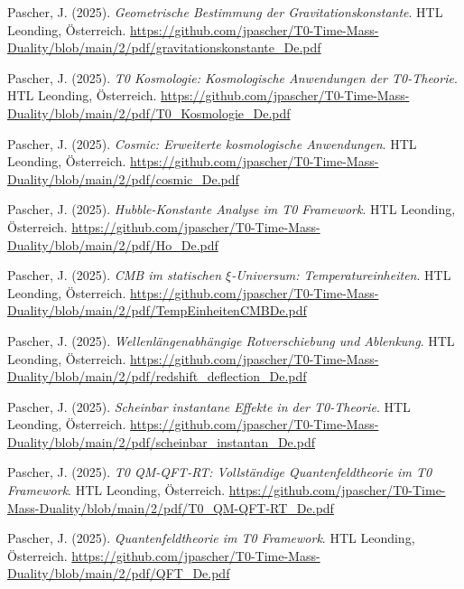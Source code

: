 \documentclass{article}
\begin{document}
\begin{thebibliography}{99}
		Pascher, J. (2025).
		\textit{Geometrische Bestimmung der Gravitationskonstante}.
		HTL Leonding, Österreich.
		\url{https://github.com/jpascher/T0-Time-Mass-Duality/blob/main/2/pdf/gravitationskonstante_De.pdf}
		
		
		Pascher, J. (2025).
		\textit{T0 Kosmologie: Kosmologische Anwendungen der T0-Theorie}.
		HTL Leonding, Österreich.
		\url{https://github.com/jpascher/T0-Time-Mass-Duality/blob/main/2/pdf/T0_Kosmologie_De.pdf}
		
		Pascher, J. (2025).
		\textit{Cosmic: Erweiterte kosmologische Anwendungen}.
		HTL Leonding, Österreich.
		\url{https://github.com/jpascher/T0-Time-Mass-Duality/blob/main/2/pdf/cosmic_De.pdf}
		
		Pascher, J. (2025).
		\textit{Hubble-Konstante Analyse im T0 Framework}.
		HTL Leonding, Österreich.
		\url{https://github.com/jpascher/T0-Time-Mass-Duality/blob/main/2/pdf/Ho_De.pdf}
		
		Pascher, J. (2025).
		\textit{CMB im statischen $\xi$-Universum: Temperatureinheiten}.
		HTL Leonding, Österreich.
		\url{https://github.com/jpascher/T0-Time-Mass-Duality/blob/main/2/pdf/TempEinheitenCMBDe.pdf}
		
		Pascher, J. (2025).
		\textit{Wellenlängenabhängige Rotverschiebung und Ablenkung}.
		HTL Leonding, Österreich.
		\url{https://github.com/jpascher/T0-Time-Mass-Duality/blob/main/2/pdf/redshift_deflection_De.pdf}
		
		Pascher, J. (2025).
		\textit{Scheinbar instantane Effekte in der T0-Theorie}.
		HTL Leonding, Österreich.
		\url{https://github.com/jpascher/T0-Time-Mass-Duality/blob/main/2/pdf/scheinbar_instantan_De.pdf}
		
		
		Pascher, J. (2025).
		\textit{T0 QM-QFT-RT: Vollständige Quantenfeldtheorie im T0 Framework}.
		HTL Leonding, Österreich.
		\url{https://github.com/jpascher/T0-Time-Mass-Duality/blob/main/2/pdf/T0_QM-QFT-RT_De.pdf}
		
		Pascher, J. (2025).
		\textit{Quantenfeldtheorie im T0 Framework}.
		HTL Leonding, Österreich.
		\url{https://github.com/jpascher/T0-Time-Mass-Duality/blob/main/2/pdf/QFT_De.pdf}
		

\end{thebibliography}
\end{document}
